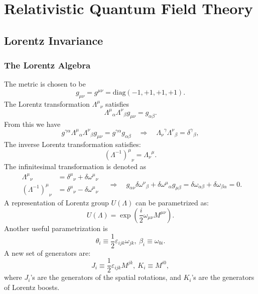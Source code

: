 \chapter{Relativistic Quantum Field Theory}

\section{Lorentz Invariance}

\subsection{The Lorentz Algebra}
The metric is chosen to be 
\begin{equation}
	g_{\mu\nu}=g^{\mu\nu}=\mathrm{diag}(-1,+1,+1,+1).
\end{equation}
The Lorentz transformation ${\Lambda^{\mu}}_{\nu}$ satisfies
\begin{equation}
{\Lambda^{\mu}}_{\alpha}{\Lambda^{\nu}}_{\beta} g_{\mu\nu} = g_{\alpha\beta}.
\end{equation}
From this we have
\begin{equation*}
	g^{\gamma\alpha}{\Lambda^{\mu}}_{\alpha}{\Lambda^{\nu}}_{\beta} g_{\mu\nu} 
	= g^{\gamma\alpha}g_{\alpha\beta} 
	\quad \Longrightarrow \quad
	{\Lambda_{\nu}}^{\gamma}{\Lambda^{\nu}}_{\beta} 
	= {\delta^{\gamma}}_{\beta},
\end{equation*}
The inverse Lorentz transformation satisfies:
\begin{equation*}
	{(\Lambda^{-1})^{\mu}}_{\nu} = {\Lambda_{\nu}}^{\mu}.
\end{equation*}
The infinitesimal transformation is denoted as
\begin{equation*}
\begin{aligned}
	{\Lambda^{\mu}}_{\nu} &= {\delta^{\mu}}_{\nu}+\delta{\omega^{\mu}}_{\nu} \\
	{(\Lambda^{-1})^\mu}_\nu &= {\delta^{\mu}}_{\nu}-\delta{\omega^\mu}_\nu
\end{aligned}
	\quad \Longrightarrow \quad
	g_{\alpha\nu}\delta{\omega^{\nu}}_{\beta}+\delta{\omega^{\mu}}_{\alpha}g_{\mu\beta}
	=\delta\omega_{\alpha\beta} + \delta\omega_{\beta\alpha} = 0.
\end{equation*}
A representation of Lorentz group $U(\Lambda)$ can be parametrized as:
\begin{equation}
	U(\Lambda) = \exp\left(\frac{i}{2}\omega_{\mu\nu}M^{\mu\nu}\right).
\end{equation}
Another useful parametrization is
\begin{equation*}
	\theta_i \equiv \frac{1}{2}\varepsilon_{ijk}\omega_{jk}, \ 
	\beta_i \equiv \omega_{0i}.
\end{equation*}
A new set of generators are:
\begin{equation}
	J_i \equiv \frac{1}{2}\varepsilon_{ijk}M^{jk},\ 
	K_i \equiv M^{i0},
\end{equation}
where $J_i$'s are the generators of the spatial rotations, and $K_i$'s are the generators of Lorentz boosts.

